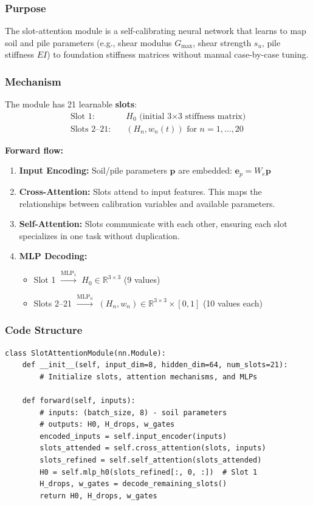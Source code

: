 \documentclass[11pt,a4paper]{article}
\begin{document}
\subsubsection{Purpose}
The slot-attention module is a self-calibrating neural network that learns to map soil and pile parameters (e.g., shear modulus $G_{\max}$, shear strength $s_u$, pile stiffness $EI$) to foundation stiffness matrices without manual case-by-case tuning.

\subsubsection{Mechanism}

The module has 21 learnable \textbf{slots}:
\begin{align}
  \text{Slot 1:} \quad & H_0 \text{ (initial 3×3 stiffness matrix)} \\
  \text{Slots 2--21:} \quad & (H_n, w_n(t)) \text{ for } n=1,\ldots,20
\end{align}

\textbf{Forward flow:}
\begin{enumerate}
  \item \textbf{Input Encoding:} Soil/pile parameters $\mathbf{p}$ are embedded: $\mathbf{e}_p = W_e \mathbf{p}$
  \item \textbf{Cross-Attention:} Slots attend to input features. This maps the relationships between calibration variables and available parameters.
  \item \textbf{Self-Attention:} Slots communicate with each other, ensuring each slot specializes in one task without duplication.
  \item \textbf{MLP Decoding:}
    \begin{itemize}
      \item Slot 1 $\xrightarrow{\text{MLP}_1}$ $H_0 \in \mathbb{R}^{3 \times 3}$ (9 values)
      \item Slots 2--21 $\xrightarrow{\text{MLP}_n}$ $(H_n, w_n) \in \mathbb{R}^{3 \times 3} \times [0,1]$ (10 values each)
    \end{itemize}
\end{enumerate}

\subsubsection{Code Structure}

\begin{lstlisting}
class SlotAttentionModule(nn.Module):
    def __init__(self, input_dim=8, hidden_dim=64, num_slots=21):
        # Initialize slots, attention mechanisms, and MLPs

    def forward(self, inputs):
        # inputs: (batch_size, 8) - soil parameters
        # outputs: H0, H_drops, w_gates
        encoded_inputs = self.input_encoder(inputs)
        slots_attended = self.cross_attention(slots, inputs)
        slots_refined = self.self_attention(slots_attended)
        H0 = self.mlp_h0(slots_refined[:, 0, :])  # Slot 1
        H_drops, w_gates = decode_remaining_slots()
        return H0, H_drops, w_gates
\end{lstlisting}
\end{document}

